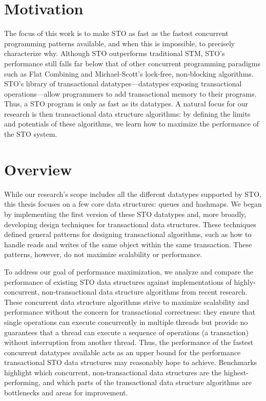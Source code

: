 \section{Motivation}
The focus of this work is to make STO as fast as the fastest concurrent programming patterns available, and when this is impossible, to precisely characterize why. Although STO outperforms traditional STM, STO’s performance still falls far below that of other concurrent programming paradigms such as Flat Combining\cite{flatcombining} and Michael-Scott's lock-free, non-blocking algorithms\cite{queue1}. STO’s library of transactional datatypes---datatypes exposing transactional operations---allow programmers to add transactional memory to their programs. Thus, a STO program is only as fast as its datatypes. A natural focus for our research is then transactional data structure algorithms: by defining the limits and potentials of these algorithms, we learn how to maximize the performance of the STO system.

\section{Overview}
While our research's scope includes all the different datatypes supported by STO, this thesis focuses on a few core data structures: queues and hashmaps. We began by implementing the first version of these STO datatypes and, more broadly, developing design techniques for transactional data structures. These techniques defined general patterns for designing transactional algorithms, such as how to handle reads and writes of the same object within the same transaction. These patterns, however, do not maximize scalability or performance.

To address our goal of performance maximization, we analyze and compare the performance of existing STO data structures against implementations of highly-concurrent, non-transactional data structure algorithms from recent research. These concurrent data structure algorithms strive to maximize scalability and performance without the concern for transactional correctness: they ensure that single operations can execute concurrently in multiple threads but provide no guarantees that a thread can execute a sequence of operations (a transaction) without interruption from another thread.
Thus, the performance of the fastest concurrent datatypes available acts as an upper bound for the performance transactional STO data structures may reasonably hope to achieve. Benchmarks highlight which concurrent, non-transactional data structures are the highest-performing, and which parts of the transactional data structure algorithms are bottlenecks and areas for improvement. 

